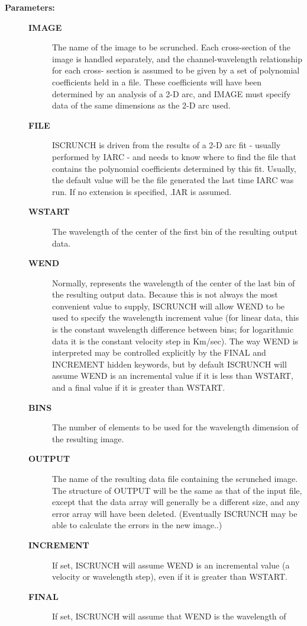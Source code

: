 \begin{description}
\item [{\bf Parameters:}]
\begin{description}
\item [{\bf IMAGE}]
 The name of the image to be scrunched.  Each
 cross-section of the image is handled separately, and
 the channel-wavelength relationship for each cross-
 section is assumed to be given by a set of polynomial
 coefficients held in a file.  These coefficients will
 have been determined by an analysis of a 2-D arc, and
 IMAGE must specify data of the same dimensions as the
 2-D arc used.
\item [{\bf FILE}]
 ISCRUNCH is driven from the results of a 2-D arc fit -
 usually performed by IARC - and needs to know where to
 find the file that contains the polynomial coefficients
 determined by this fit.  Usually, the default value will
 be the file generated the last time IARC was run.  If no
 extension is specified, .IAR is assumed.
\item [{\bf WSTART}]
 The wavelength of the center of the first bin
 of the resulting output data.
\item [{\bf WEND}]
 Normally, represents the wavelength of the center of
 the last bin of the resulting output data.  Because this
 is not always the most convenient value to supply, ISCRUNCH
 will allow WEND to be used to specify the wavelength
 increment value (for linear data, this is the constant
 wavelength difference between bins; for logarithmic data
 it is the constant velocity step in Km/sec).  The way
 WEND is interpreted may be controlled explicitly by the
 FINAL and INCREMENT hidden keywords, but by default ISCRUNCH
 will assume WEND is an incremental value if it is less than
 WSTART, and a final value if it is greater than WSTART.
\item [{\bf BINS}]
 The number of elements to be used for the
 wavelength dimension of the resulting image.
\item [{\bf OUTPUT}]
 The name of the resulting data file containing
 the scrunched image. The structure of OUTPUT will be the
 same as that of the input file, except that the data array
 will generally be a different size, and any error array
 will have been deleted.  (Eventually ISCRUNCH may be able
 to calculate the errors in the new image..)
\item [{\bf INCREMENT}]
 If set, ISCRUNCH will assume WEND is an incremental value
 (a velocity or wavelength step), even if it is greater than
 WSTART.
\item [{\bf FINAL}]
 If set, ISCRUNCH will assume that WEND is the wavelength of

\end{description}
\end{description}
